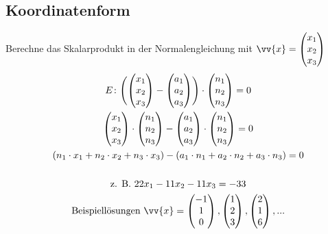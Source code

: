 \subsection{Koordinatenform}
Berechne das Skalarprodukt in der Normalengleichung mit $\vv{x} = \begin{pmatrix}x_1 \\ x_2 \\ x_3\end{pmatrix}$
\begin{gather*}
  E \colon \Biggl(\begin{pmatrix}x_1 \\ x_2 \\ x_3\end{pmatrix} - \begin{pmatrix}a_1 \\ a_2 \\ a_3\end{pmatrix}\Biggr) \cdot \begin{pmatrix}n_1 \\ n_2 \\ n_3\end{pmatrix} = 0 \\
  \begin{pmatrix}x_1 \\ x_2 \\ x_3\end{pmatrix} \cdot \begin{pmatrix}n_1 \\ n_2 \\ n_3\end{pmatrix} - \begin{pmatrix}a_1 \\ a_2 \\ a_3\end{pmatrix} \cdot \begin{pmatrix}n_1 \\ n_2 \\ n_3\end{pmatrix} = 0 \\
  (n_1 \cdot x_1 + n_2 \cdot x_2 + n_3 \cdot x_3) - (a_1 \cdot n_1 + a_2 \cdot n_2 + a_3 \cdot n_3) = 0 \\\\
  \text{z. B. } 22x_1 - 11x_2 - 11x_3 = -33 \\
  \text{Beispiellösungen } \vv{x} = \begin{pmatrix}-1 \\ 1 \\ 0\end{pmatrix}, \begin{pmatrix}1 \\ 2 \\ 3\end{pmatrix}, \begin{pmatrix}2 \\ 1 \\ 6\end{pmatrix}, ...
\end{gather*}
